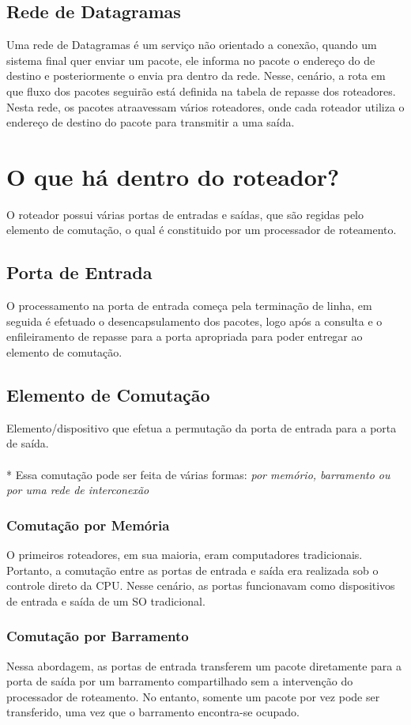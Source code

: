 \documentclass[a4paper, 12pt]{article}
\begin{document}
\subsection{Rede de Datagramas}
Uma rede de Datagramas é um serviço não orientado a conexão, quando um sistema final quer enviar um pacote, ele informa no pacote
o endereço do de destino e posteriormente o envia pra dentro da rede. Nesse, cenário, a rota em que fluxo dos pacotes seguirão está definida
na tabela de repasse dos roteadores. Nesta rede, os pacotes atraavessam vários roteadores, onde cada roteador utiliza o endereço de destino do 
pacote para transmitir a uma saída.

\newpage
\section{O que há dentro do roteador?}
O roteador possui várias portas de entradas e saídas, que são regidas pelo elemento de comutação, o qual é constituido por um processador de
roteamento.

\subsection{Porta de Entrada}
O processamento na porta de entrada começa pela terminação de linha, em seguida é efetuado o desencapsulamento dos pacotes, logo após a consulta e o
enfileiramento de repasse para a porta apropriada para poder entregar ao elemento de comutação.

\subsection{Elemento de Comutação}
Elemento/dispositivo que efetua a permutação da porta de entrada para a porta de saída.
\\
\\*
Essa comutação pode ser feita de várias formas: \textit{por memório, barramento ou por uma rede de interconexão}

\subsubsection{Comutação por Memória}
O primeiros roteadores, em sua maioria, eram computadores tradicionais. Portanto, a comutação entre as portas de entrada e saída era realizada 
sob o controle direto da CPU. Nesse cenário, as portas funcionavam como dispositivos de entrada e saída de um SO tradicional.

\subsubsection{Comutação por Barramento}
Nessa abordagem, as portas de entrada transferem um pacote diretamente para a porta de saída por um barramento compartilhado sem a intervenção
do processador de roteamento. No entanto, somente um pacote por vez pode ser transferido, uma vez que o barramento encontra-se ocupado.
\end{document}
